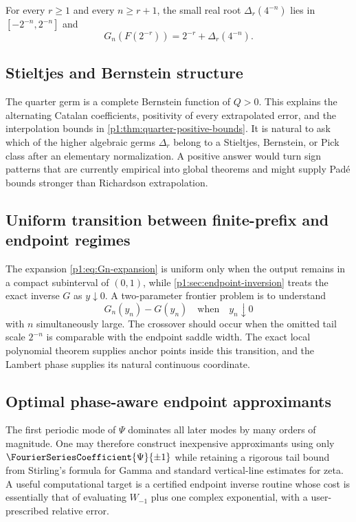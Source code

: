 \documentclass[11pt,oneside]{article}
\numberwithin{equation}{section}
\theoremstyle{definition}
\theoremstyle{remark}
\begin{document}
\begin{conjecture}
\label{p1:conj:natural-threshold}
For every $r\ge1$ and every $n\ge r+1$, the small real root
$\Delta_r(4^{-n})$ lies in $[-2^{-n},2^{-n}]$ and
\[
 G_n(F(2^{-r}))=2^{-r}+\Delta_r(4^{-n}).
\]
\end{conjecture}

\subsection{Stieltjes and Bernstein structure}

The quarter germ is a complete Bernstein function of $Q>0$.  This explains the alternating
Catalan coefficients, positivity of every extrapolated error, and the interpolation bounds in
\cref{p1:thm:quarter-positive-bounds}.  It is natural to ask which of the higher algebraic germs
$\Delta_r$ belong to a Stieltjes, Bernstein, or Pick class after an elementary normalization.
A positive answer would turn sign patterns that are currently empirical into global theorems
and might supply Pad\'e bounds stronger than Richardson extrapolation.

\subsection{Uniform transition between finite-prefix and endpoint regimes}

The expansion \eqref{p1:eq:Gn-expansion} is uniform only when the output remains in a compact
subinterval of $(0,1)$, while \cref{p1:sec:endpoint-inversion} treats the exact inverse $G$ as
$y\downarrow0$.  A two-parameter frontier problem is to understand
\begin{equation}
 G_n(y_n)-G(y_n)
 \quad\text{when}\quad y_n\downarrow0
 \label{p1:eq:double-scaling-problem}
\end{equation}
with $n$ simultaneously large.  The crossover should occur when the omitted tail scale
$2^{-n}$ is comparable with the endpoint saddle width.  The exact local polynomial theorem
supplies anchor points inside this transition, and the Lambert phase supplies its natural
continuous coordinate.

\subsection{Optimal phase-aware endpoint approximants}

The first periodic mode of $\Psi$ dominates all later modes by many orders of magnitude.
One may therefore construct inexpensive approximants using only
$\FourierSeriesCoefficient{\Psi}{\pm1}$ while retaining a rigorous tail bound from
Stirling's formula for Gamma
and standard vertical-line estimates for zeta.  A useful computational target is a certified
endpoint inverse routine whose cost is essentially that of evaluating $W_{-1}$ plus one
complex exponential, with a user-prescribed relative error.
\end{document}
